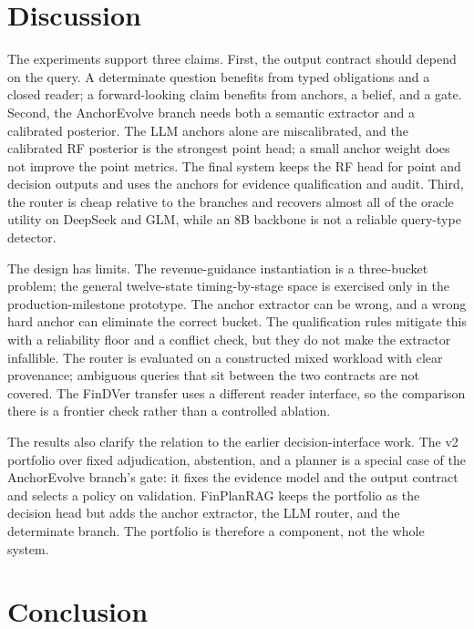 \documentclass[11pt]{article}
\newcommand{\method}{FinPlanRAG}
\begin{document}


\section{Discussion}

The experiments support three claims. First, the output contract should depend on the query. A determinate question benefits from typed obligations and a closed reader; a forward-looking claim benefits from anchors, a belief, and a gate. Second, the AnchorEvolve branch needs both a semantic extractor and a calibrated posterior. The LLM anchors alone are miscalibrated, and the calibrated RF posterior is the strongest point head; a small anchor weight does not improve the point metrics. The final system keeps the RF head for point and decision outputs and uses the anchors for evidence qualification and audit. Third, the router is cheap relative to the branches and recovers almost all of the oracle utility on DeepSeek and GLM, while an 8B backbone is not a reliable query-type detector.

The design has limits. The revenue-guidance instantiation is a three-bucket problem; the general twelve-state timing-by-stage space is exercised only in the production-milestone prototype. The anchor extractor can be wrong, and a wrong hard anchor can eliminate the correct bucket. The qualification rules mitigate this with a reliability floor and a conflict check, but they do not make the extractor infallible. The router is evaluated on a constructed mixed workload with clear provenance; ambiguous queries that sit between the two contracts are not covered. The FinDVer transfer uses a different reader interface, so the comparison there is a frontier check rather than a controlled ablation.

The results also clarify the relation to the earlier decision-interface work. The v2 portfolio over fixed adjudication, abstention, and a planner is a special case of the AnchorEvolve branch's gate: it fixes the evidence model and the output contract and selects a policy on validation. \method{} keeps the portfolio as the decision head but adds the anchor extractor, the LLM router, and the determinate branch. The portfolio is therefore a component, not the whole system.

\section{Conclusion}
\end{document}
